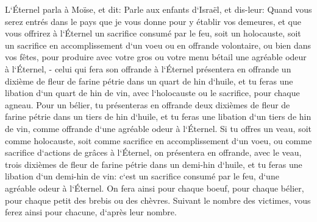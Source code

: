 \verse L`Éternel parla à Moïse, et dit: 
\verse Parle aux enfants d`Israël, et dis-leur: Quand vous serez entrés dans le pays que je vous donne pour y établir vos demeures, 
\verse et que vous offrirez à l`Éternel un sacrifice consumé par le feu, soit un holocauste, soit un sacrifice en accomplissement d`un voeu ou en offrande volontaire, ou bien dans vos fêtes, pour produire avec votre gros ou votre menu bétail une agréable odeur à l`Éternel, - 
\verse celui qui fera son offrande à l`Éternel présentera en offrande un dixième de fleur de farine pétrie dans un quart de hin d`huile, 
\verse et tu feras une libation d`un quart de hin de vin, avec l`holocauste ou le sacrifice, pour chaque agneau. 
\verse Pour un bélier, tu présenteras en offrande deux dixièmes de fleur de farine pétrie dans un tiers de hin d`huile, 
\verse et tu feras une libation d`un tiers de hin de vin, comme offrande d`une agréable odeur à l`Éternel. 
\verse Si tu offres un veau, soit comme holocauste, soit comme sacrifice en accomplissement d`un voeu, ou comme sacrifice d`actions de grâces à l`Éternel, 
\verse on présentera en offrande, avec le veau, trois dixièmes de fleur de farine pétrie dans un demi-hin d`huile, 
\verse et tu feras une libation d`un demi-hin de vin: c`est un sacrifice consumé par le feu, d`une agréable odeur à l`Éternel. 
\verse On fera ainsi pour chaque boeuf, pour chaque bélier, pour chaque petit des brebis ou des chèvres. 
\verse Suivant le nombre des victimes, vous ferez ainsi pour chacune, d`après leur nombre. 
